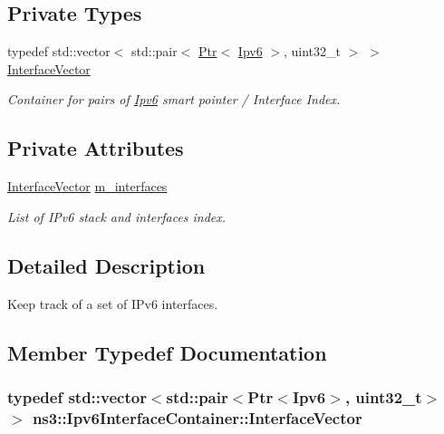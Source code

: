 \subsection*{Private Types}
\begin{DoxyCompactItemize}
\item 
typedef std\+::vector$<$ std\+::pair$<$ \hyperlink{classns3_1_1Ptr}{Ptr}$<$ \hyperlink{classns3_1_1Ipv6}{Ipv6} $>$, uint32\+\_\+t $>$ $>$ \hyperlink{classns3_1_1Ipv6InterfaceContainer_a62c74212c187a719bf1038d30c87d4d5}{Interface\+Vector}
\begin{DoxyCompactList}\small\item\em Container for pairs of \hyperlink{classns3_1_1Ipv6}{Ipv6} smart pointer / Interface Index. \end{DoxyCompactList}\end{DoxyCompactItemize}
\subsection*{Private Attributes}
\begin{DoxyCompactItemize}
\item 
\hyperlink{classns3_1_1Ipv6InterfaceContainer_a62c74212c187a719bf1038d30c87d4d5}{Interface\+Vector} \hyperlink{classns3_1_1Ipv6InterfaceContainer_a559846ada263de96a3a5d0408824712d}{m\+\_\+interfaces}
\begin{DoxyCompactList}\small\item\em List of I\+Pv6 stack and interfaces index. \end{DoxyCompactList}\end{DoxyCompactItemize}


\subsection{Detailed Description}
Keep track of a set of I\+Pv6 interfaces. 

\subsection{Member Typedef Documentation}
\subsubsection[{\texorpdfstring{Interface\+Vector}{InterfaceVector}}]{\setlength{\rightskip}{0pt plus 5cm}typedef std\+::vector$<$std\+::pair$<${\bf Ptr}$<${\bf Ipv6}$>$, uint32\+\_\+t$>$ $>$ {\bf ns3\+::\+Ipv6\+Interface\+Container\+::\+Interface\+Vector}\hspace{0.3cm}{\ttfamily [private]}}\hypertarget{classns3_1_1Ipv6InterfaceContainer_a62c74212c187a719bf1038d30c87d4d5}{}\label{classns3_1_1Ipv6InterfaceContainer_a62c74212c187a719bf1038d30c87d4d5}



